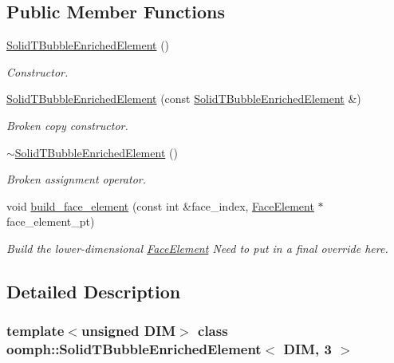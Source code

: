 \subsection*{Public Member Functions}
\begin{DoxyCompactItemize}
\item 
\hyperlink{classoomph_1_1SolidTBubbleEnrichedElement_3_01DIM_00_013_01_4_a7a3b99608a95f46afdfd27a71041c512}{Solid\+T\+Bubble\+Enriched\+Element} ()
\begin{DoxyCompactList}\small\item\em Constructor. \end{DoxyCompactList}\item 
\hyperlink{classoomph_1_1SolidTBubbleEnrichedElement_3_01DIM_00_013_01_4_a1ccb3bca66afdb8d958856d78598a176}{Solid\+T\+Bubble\+Enriched\+Element} (const \hyperlink{classoomph_1_1SolidTBubbleEnrichedElement}{Solid\+T\+Bubble\+Enriched\+Element} \&)
\begin{DoxyCompactList}\small\item\em Broken copy constructor. \end{DoxyCompactList}\item 
\hyperlink{classoomph_1_1SolidTBubbleEnrichedElement_3_01DIM_00_013_01_4_ad43bca4673e181c5a31cc0bb82089aa3}{$\sim$\+Solid\+T\+Bubble\+Enriched\+Element} ()
\begin{DoxyCompactList}\small\item\em Broken assignment operator. \end{DoxyCompactList}\item 
void \hyperlink{classoomph_1_1SolidTBubbleEnrichedElement_3_01DIM_00_013_01_4_a854529bd5bea023ac6a6d1cbae1a80c0}{build\+\_\+face\+\_\+element} (const int \&face\+\_\+index, \hyperlink{classoomph_1_1FaceElement}{Face\+Element} $\ast$face\+\_\+element\+\_\+pt)
\begin{DoxyCompactList}\small\item\em Build the lower-\/dimensional \hyperlink{classoomph_1_1FaceElement}{Face\+Element} Need to put in a final override here. \end{DoxyCompactList}\end{DoxyCompactItemize}


\subsection{Detailed Description}
\subsubsection*{template$<$unsigned D\+IM$>$\newline
class oomph\+::\+Solid\+T\+Bubble\+Enriched\+Element$<$ D\+I\+M, 3 $>$}

